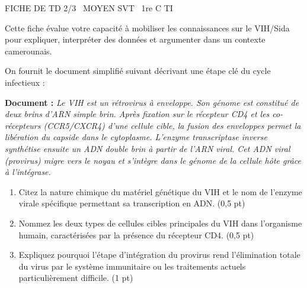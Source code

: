 \documentclass[11pt]{article}
\begin{document}
\begin{tcolorbox}[enhanced,colback=popink,colframe=popink,arc=10pt,boxrule=0pt,left=12pt,right=12pt,top=9pt,bottom=9pt]
{\color{white}\popxbold\small FICHE DE TD 2/3 \textbullet\ MOYEN \hfill SVT \textbullet\ 1re C TI\par}
\end{tcolorbox}
\vspace{4pt}
Cette fiche évalue votre capacité à mobiliser les connaissances sur le VIH/Sida pour expliquer, interpréter des données et argumenter dans un contexte camerounais.

\begin{exercice}
\label{exo:structure}
On fournit le document simplifié suivant décrivant une étape clé du cycle infectieux :

\medskip
\noindent \textbf{Document :} \textit{Le VIH est un rétrovirus à enveloppe. Son génome est constitué de deux brins d'ARN simple brin. Après fixation sur le récepteur CD4 et les co-récepteurs (CCR5/CXCR4) d'une cellule cible, la fusion des enveloppes permet la libération du capside dans le cytoplasme. L'enzyme transcriptase inverse synthétise ensuite un ADN double brin à partir de l'ARN viral. Cet ADN viral (provirus) migre vers le noyau et s'intègre dans le génome de la cellule hôte grâce à l'intégrase.}

\medskip
\begin{enumerate}
    \item Citez la nature chimique du matériel génétique du VIH et le nom de l'enzyme virale spécifique permettant sa transcription en ADN. \hfill (0,5 pt)
    \item Nommez les deux types de cellules cibles principales du VIH dans l'organisme humain, caractérisées par la présence du récepteur CD4. \hfill (0,5 pt)
    \item Expliquez pourquoi l'étape d'intégration du provirus rend l'élimination totale du virus par le système immunitaire ou les traitements actuels particulièrement difficile. \hfill (1 pt)
\end{enumerate}
\end{exercice}
\end{document}
